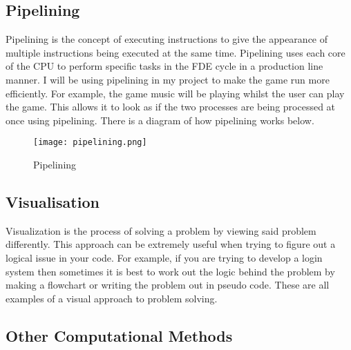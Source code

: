 \documentclass[12pt]{report}
\begin{document}
\subsection{Pipelining}
Pipelining is the concept of executing instructions to give the appearance of multiple instructions being executed at the same time. Pipelining uses each core of the CPU to perform specific tasks in the FDE cycle in a production line manner. I will be using pipelining in my project to make the game run more efficiently. For example, the game music will be playing whilst the user can play the game. This allows it to look as if the two processes are being processed at once using pipelining. There is a diagram of how pipelining works below.

\begin{figure}[H]
    \centering
    \texttt{[image: pipelining.png]}
    \caption{Pipelining \cite{pipelining}}
    \label{Pipelining}
\end{figure}

\subsection{Visualisation}
Visualization is the process of solving a problem by viewing said problem differently. This approach can be extremely useful when trying to figure out a logical issue in your code. For example, if you are trying to develop a login system then sometimes it is best to work out the logic behind the problem by making a flowchart or writing the problem out in pseudo code. These are all examples of a visual approach to problem solving. 

\subsection{Other Computational Methods}
\end{document}
